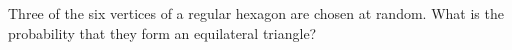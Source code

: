 Three of the six vertices of a regular hexagon are chosen at random. What is the probability that they form an equilateral triangle?
